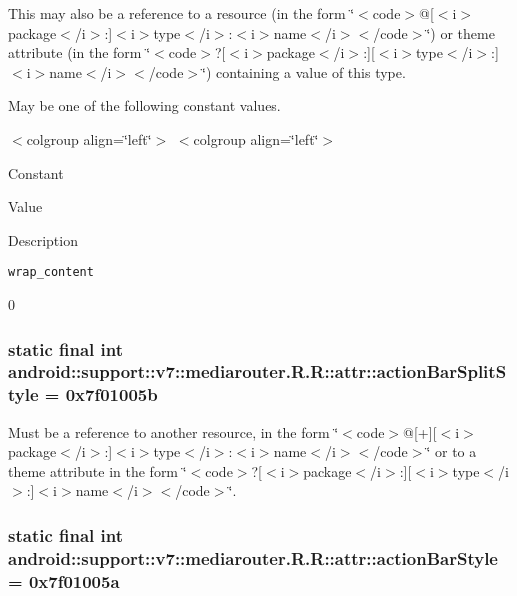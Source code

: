 This may also be a reference to a resource (in the form \char`\"{}$<$code$>$@\mbox{[}$<$i$>$package$<$/i$>$:\mbox{]}$<$i$>$type$<$/i$>$:$<$i$>$name$<$/i$>$$<$/code$>$\char`\"{}) or theme attribute (in the form \char`\"{}$<$code$>$?\mbox{[}$<$i$>$package$<$/i$>$:\mbox{]}\mbox{[}$<$i$>$type$<$/i$>$:\mbox{]}$<$i$>$name$<$/i$>$$<$/code$>$\char`\"{}) containing a value of this type. 

May be one of the following constant values. \begin{TabularC}{0}
\hline
\end{TabularC}
$<$colgroup align=\char`\"{}left\char`\"{}$>$ $<$colgroup align=\char`\"{}left\char`\"{}$>$ 

Constant

Value

Description 

{\tt wrap\_\-content}

0\hypertarget{classandroid_1_1support_1_1v7_1_1mediarouter_1_1_r_1_1attr_c103047e516bc7a7b3ef4a6d8a057b9c}{
\subsubsection[{actionBarSplitStyle}]{\setlength{\rightskip}{0pt plus 5cm}static final int android::support::v7::mediarouter.R.R::attr::actionBarSplitStyle = 0x7f01005b}}
\label{classandroid_1_1support_1_1v7_1_1mediarouter_1_1_r_1_1attr_c103047e516bc7a7b3ef4a6d8a057b9c}


Must be a reference to another resource, in the form \char`\"{}$<$code$>$@\mbox{[}+\mbox{]}\mbox{[}$<$i$>$package$<$/i$>$:\mbox{]}$<$i$>$type$<$/i$>$:$<$i$>$name$<$/i$>$$<$/code$>$\char`\"{} or to a theme attribute in the form \char`\"{}$<$code$>$?\mbox{[}$<$i$>$package$<$/i$>$:\mbox{]}\mbox{[}$<$i$>$type$<$/i$>$:\mbox{]}$<$i$>$name$<$/i$>$$<$/code$>$\char`\"{}. \hypertarget{classandroid_1_1support_1_1v7_1_1mediarouter_1_1_r_1_1attr_c1b3da10a9140262290358f84d92448a}{
\subsubsection[{actionBarStyle}]{\setlength{\rightskip}{0pt plus 5cm}static final int android::support::v7::mediarouter.R.R::attr::actionBarStyle = 0x7f01005a}}
\label{classandroid_1_1support_1_1v7_1_1mediarouter_1_1_r_1_1attr_c1b3da10a9140262290358f84d92448a}



